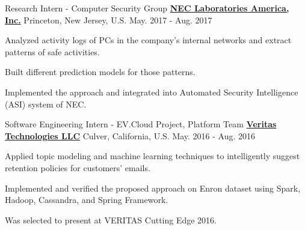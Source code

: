

\begin{cventries}
\cventry
{Research Intern - Computer Security Group} %
{\href{http://www.nec-labs.com/}{\bf NEC Laboratories America, Inc.}}  %
{Princeton, New Jersey, U.S.} %
{May. 2017 - Aug. 2017} %
{
	\begin{cvitems} %
		\item Analyzed activity logs of PCs in the company's internal networks and extract patterns of safe activities.
		\item Built different prediction models for those patterns.
		\item Implemented the approach and integrated into Automated Security Intelligence (ASI) system of NEC.
	\end{cvitems}
}
	
	
\cventry
{Software Engineering Intern - EV.Cloud Project, Platform Team} %
{\href{https://www.veritas.com/}{\bf Veritas Technologies LLC}}  %
{Culver, California, U.S.} %
{May. 2016 - Aug. 2016} %
{
	\begin{cvitems} %
		\item Applied topic modeling and machine learning techniques to intelligently suggest retention policies for customers' emails.
		\item Implemented and verified the proposed approach on Enron dataset using Spark, Hadoop, Cassandra, and Spring Framework.
		\item Was selected to present at VERITAS Cutting Edge 2016.
	\end{cvitems}
}


\end{cventries}
